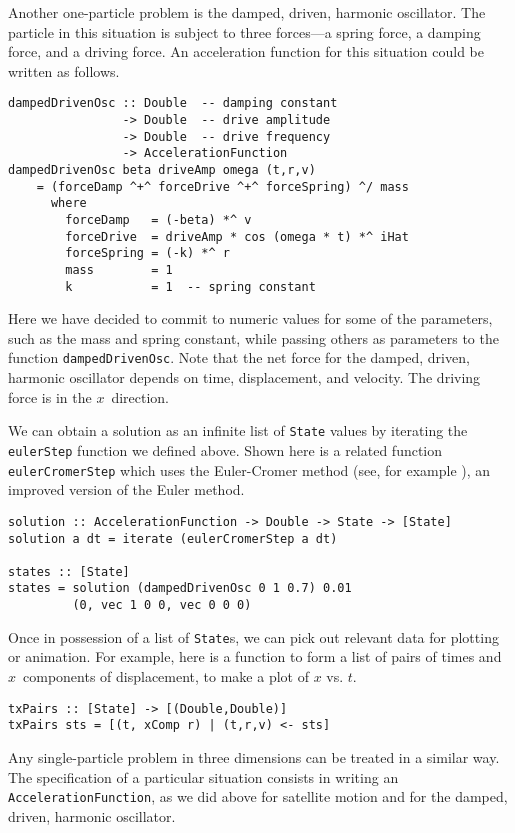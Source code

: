 \documentclass{eptcs}
\begin{document}
Another one-particle problem is the damped, driven, harmonic oscillator.
The particle in this situation is subject to three forces---a spring force,
a damping force, and a driving force.
An acceleration function for this situation could be written as follows.
\begin{verbatim}
dampedDrivenOsc :: Double  -- damping constant
                -> Double  -- drive amplitude
                -> Double  -- drive frequency
                -> AccelerationFunction
dampedDrivenOsc beta driveAmp omega (t,r,v)
    = (forceDamp ^+^ forceDrive ^+^ forceSpring) ^/ mass
      where
        forceDamp   = (-beta) *^ v
        forceDrive  = driveAmp * cos (omega * t) *^ iHat
        forceSpring = (-k) *^ r
        mass        = 1
        k           = 1  -- spring constant
\end{verbatim}
Here we have decided to commit to numeric values for some of the parameters, such
as the mass and spring constant, while passing others as parameters
to the function \verb|dampedDrivenOsc|.
Note that the net force for the damped, driven, harmonic oscillator
depends on time, displacement, and velocity.  The driving force is
in the $x$~direction.

We can obtain a solution as an infinite list of \verb|State| values by iterating
the \verb|eulerStep| function we defined above.  Shown here is a related function
\verb|eulerCromerStep| which uses the Euler-Cromer method
(see, for example \cite{giordano97}), an improved
version of the Euler method.

\begin{verbatim}
solution :: AccelerationFunction -> Double -> State -> [State]
solution a dt = iterate (eulerCromerStep a dt)

states :: [State]
states = solution (dampedDrivenOsc 0 1 0.7) 0.01
         (0, vec 1 0 0, vec 0 0 0)
\end{verbatim}

Once in possession of a list of \verb|State|s,
we can pick out relevant data for plotting or animation.
For example, here is a function to form a list of pairs of times and $x$~components
of displacement, to make a plot of $x$ vs. $t$.
\begin{verbatim}
txPairs :: [State] -> [(Double,Double)]
txPairs sts = [(t, xComp r) | (t,r,v) <- sts]
\end{verbatim}

Any single-particle problem in three dimensions can be treated in a similar
way.  The specification of a particular situation consists in writing
an \verb|AccelerationFunction|, as we did above for
satellite motion and for the damped, driven, harmonic oscillator.
\end{document}
